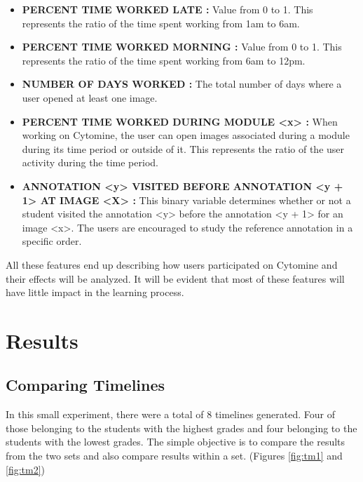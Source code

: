 \documentclass[a4paper,11pt]{report}
\numberwithin{figure}{section} %
\begin{document}
\begin{itemize}
    \item[\textbullet] \textbf{PERCENT TIME WORKED LATE :} Value from 0 to 1.
    This represents the ratio of the time spent working from 1am to 6am.

    \item[\textbullet] \textbf{PERCENT TIME WORKED MORNING :} Value from 0 to 1.
    This represents the ratio of the time spent working from 6am to 12pm.

    \item[\textbullet] \textbf{NUMBER OF DAYS WORKED :} The total number of days where a user opened at least one image.

    \item[\textbullet] \textbf{PERCENT TIME WORKED DURING MODULE <x> :} When working on Cytomine, the user can open images associated during a module during its time period or outside of it.
    This represents the ratio of the user activity during the time period.

	\item[\textbullet] \textbf{ANNOTATION <y> VISITED BEFORE ANNOTATION <y + 1> AT IMAGE <X> :} This binary variable determines whether or not a student visited the annotation <y> before the annotation <y + 1> for an image <x>.
	The users are encouraged to study the reference annotation in a specific order.

    \end{itemize}


    All these features end up describing how users participated on Cytomine and their effects will be analyzed.
    It will be evident that most of these features will have little impact in the learning process.

    \section{Results}

    \subsection{Comparing Timelines}

        In this small experiment, there were a total of 8 timelines generated.
        Four of those belonging to the students with the highest grades and four belonging to the students with the lowest grades.
        The simple objective is to compare the results from the two sets and also compare results within a set. (Figures \ref{fig:tm1} and \ref{fig:tm2})
\end{document}
